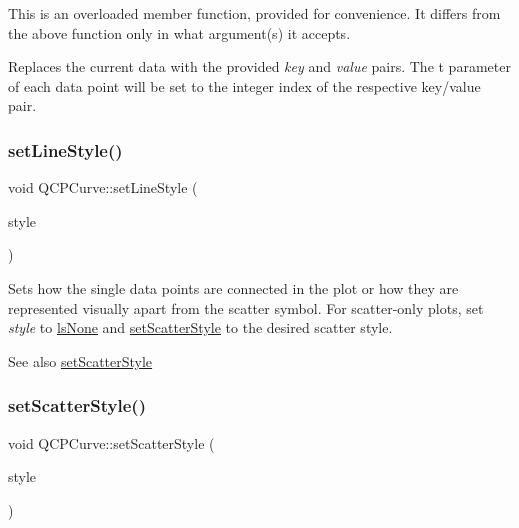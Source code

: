 This is an overloaded member function, provided for convenience. It differs from the above function only in what argument(s) it accepts.

Replaces the current data with the provided {\itshape key} and {\itshape value} pairs. The t parameter of each data point will be set to the integer index of the respective key/value pair. \mbox{\label{class_q_c_p_curve_a4a377ec863ff81a1875c3094a6177c19}} 
\subsubsection{\texorpdfstring{set\+Line\+Style()}{setLineStyle()}}
{\footnotesize\ttfamily void Q\+C\+P\+Curve\+::set\+Line\+Style (\begin{DoxyParamCaption}\item[{\mbox{\hyperlink{class_q_c_p_curve_a2710e9f79302152cff794c6e16cc01f1}{Q\+C\+P\+Curve\+::\+Line\+Style}}}]{style }\end{DoxyParamCaption})}

Sets how the single data points are connected in the plot or how they are represented visually apart from the scatter symbol. For scatter-\/only plots, set {\itshape style} to \mbox{\hyperlink{class_q_c_p_curve_a2710e9f79302152cff794c6e16cc01f1aec1601a191cdf0b4e761c4c66092cc48}{ls\+None}} and \mbox{\hyperlink{class_q_c_p_curve_a55e43b44709bf50a35500644988aa706}{set\+Scatter\+Style}} to the desired scatter style.

\begin{DoxySeeAlso}{See also}
\mbox{\hyperlink{class_q_c_p_curve_a55e43b44709bf50a35500644988aa706}{set\+Scatter\+Style}} 
\end{DoxySeeAlso}
\mbox{\label{class_q_c_p_curve_a55e43b44709bf50a35500644988aa706}} 
\subsubsection{\texorpdfstring{set\+Scatter\+Style()}{setScatterStyle()}}
{\footnotesize\ttfamily void Q\+C\+P\+Curve\+::set\+Scatter\+Style (\begin{DoxyParamCaption}\item[{const \mbox{\hyperlink{class_q_c_p_scatter_style}{Q\+C\+P\+Scatter\+Style}} \&}]{style }\end{DoxyParamCaption})}


